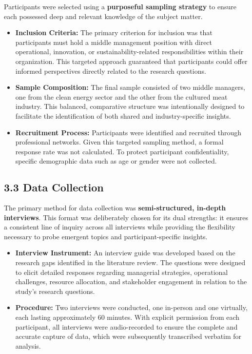 Participants were selected using a \textbf{purposeful sampling strategy} to ensure each possessed deep and relevant knowledge of the subject matter. 
\begin{itemize}
	\item \textbf{Inclusion Criteria:} The primary criterion for inclusion was that participants must hold a middle management position with direct operational, innovation, or sustainability-related responsibilities within their organization. This targeted approach guaranteed that participants could offer informed perspectives directly related to the research questions.
	\item \textbf{Sample Composition:} The final sample consisted of two middle managers, one from the clean energy sector and the other from the cultured meat industry. This balanced, comparative structure was intentionally designed to facilitate the identification of both shared and industry-specific insights.
	\item \textbf{Recruitment Process:} Participants were identified and recruited through professional networks. Given this targeted sampling method, a formal response rate was not calculated. To protect participant confidentiality, specific demographic data such as age or gender were not collected.
\end{itemize}

\subsection*{3.3 Data Collection}

The primary method for data collection was \textbf{semi-structured, in-depth interviews}. This format was deliberately chosen for its dual strengths: it ensures a consistent line of inquiry across all interviews while providing the flexibility necessary to probe emergent topics and participant-specific insights.
\begin{itemize}
	\item \textbf{Interview Instrument:} An interview guide was developed based on the research gaps identified in the literature review. The questions were designed to elicit detailed responses regarding managerial strategies, operational challenges, resource allocation, and stakeholder engagement in relation to the study's research questions.
	\item \textbf{Procedure:} Two interviews were conducted, one in-person and one virtually, each lasting approximately 60 minutes. With explicit permission from each participant, all interviews were audio-recorded to ensure the complete and accurate capture of data, which were subsequently transcribed verbatim for analysis.
\end{itemize}

